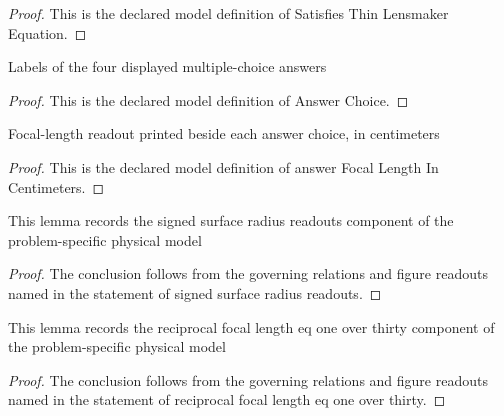 \begin{proof}
  This is the declared model definition of Satisfies Thin Lensmaker Equation.
\end{proof}
\begin{definition}
  \label{def:physics:phyx-mini-0064:phyxminiproblems-problemphyxmini0064-answerchoice}
  Labels of the four displayed multiple-choice answers
\end{definition}
\begin{proof}
  This is the declared model definition of Answer Choice.
\end{proof}
\begin{definition}
  \label{def:physics:phyx-mini-0064:phyxminiproblems-problemphyxmini0064-answerfocallengthincentimeters}
  Focal-length readout printed beside each answer choice, in centimeters
\end{definition}
\begin{proof}
  This is the declared model definition of answer Focal Length In Centimeters.
\end{proof}
\begin{lemma}
  \label{lem:physics:phyx-mini-0064:phyxminiproblems-problemphyxmini0064-signed-surface-radius-readouts}
  This lemma records the signed surface radius readouts component of the problem-specific physical model
\end{lemma}
\begin{proof}
  The conclusion follows from the governing relations and figure readouts named in the statement of signed surface radius readouts.
\end{proof}
\begin{lemma}
  \label{lem:physics:phyx-mini-0064:phyxminiproblems-problemphyxmini0064-reciprocal-focal-length-eq-one-over-thirty}
  This lemma records the reciprocal focal length eq one over thirty component of the problem-specific physical model
\end{lemma}
\begin{proof}
  The conclusion follows from the governing relations and figure readouts named in the statement of reciprocal focal length eq one over thirty.
\end{proof}
